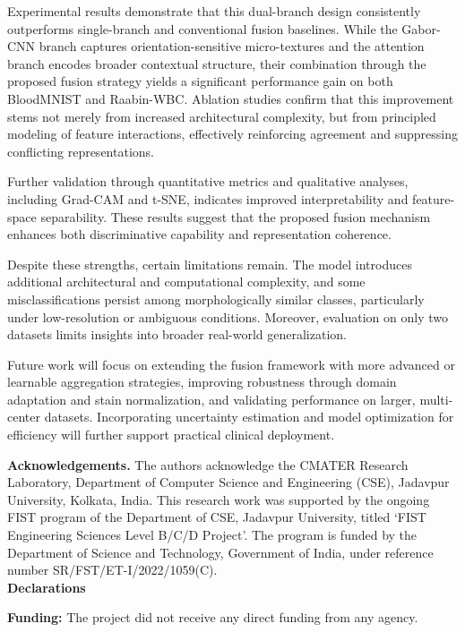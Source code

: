 \documentclass[preprint,12pt]{elsarticle}
\begin{document}
Experimental results demonstrate that this dual-branch design consistently outperforms single-branch and conventional fusion baselines. While the Gabor-CNN branch captures orientation-sensitive micro-textures and the attention branch encodes broader contextual structure, their combination through the proposed fusion strategy yields a significant performance gain on both BloodMNIST and Raabin-WBC. Ablation studies confirm that this improvement stems not merely from increased architectural complexity, but from principled modeling of feature interactions, effectively reinforcing agreement and suppressing conflicting representations.

Further validation through quantitative metrics and qualitative analyses, including Grad-CAM and t-SNE, indicates improved interpretability and feature-space separability. These results suggest that the proposed fusion mechanism enhances both discriminative capability and representation coherence.

Despite these strengths, certain limitations remain. The model introduces additional architectural and computational complexity, and some misclassifications persist among morphologically similar classes, particularly under low-resolution or ambiguous conditions. Moreover, evaluation on only two datasets limits insights into broader real-world generalization.

Future work will focus on extending the fusion framework with more advanced or learnable aggregation strategies, improving robustness through domain adaptation and stain normalization, and validating performance on larger, multi-center datasets. Incorporating uncertainty estimation and model optimization for efficiency will further support practical clinical deployment.

\textbf{Acknowledgements.} The authors acknowledge the CMATER Research Laboratory, Department of Computer Science and Engineering (CSE), Jadavpur University, Kolkata, India. This research work was supported by the ongoing FIST program of the Department of CSE, Jadavpur University, titled ‘FIST Engineering Sciences Level B/C/D Project’. The program is funded by the Department of Science and Technology, Government of India, under reference number SR/FST/ET-I/2022/1059(C).
\vspace{13pt}
\\
\textbf{Declarations}

\noindent\textbf{Funding:} The project did not receive any direct funding from any agency.
\end{document}
